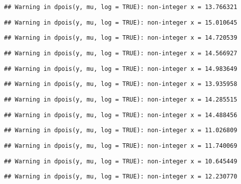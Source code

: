 \documentclass[
]{article}
\begin{document}
\begin{verbatim}
## Warning in dpois(y, mu, log = TRUE): non-integer x = 13.766321
\end{verbatim}

\begin{verbatim}
## Warning in dpois(y, mu, log = TRUE): non-integer x = 15.010645
\end{verbatim}

\begin{verbatim}
## Warning in dpois(y, mu, log = TRUE): non-integer x = 14.720539
\end{verbatim}

\begin{verbatim}
## Warning in dpois(y, mu, log = TRUE): non-integer x = 14.566927
\end{verbatim}

\begin{verbatim}
## Warning in dpois(y, mu, log = TRUE): non-integer x = 14.983649
\end{verbatim}

\begin{verbatim}
## Warning in dpois(y, mu, log = TRUE): non-integer x = 13.935958
\end{verbatim}

\begin{verbatim}
## Warning in dpois(y, mu, log = TRUE): non-integer x = 14.285515
\end{verbatim}

\begin{verbatim}
## Warning in dpois(y, mu, log = TRUE): non-integer x = 14.488456
\end{verbatim}

\begin{verbatim}
## Warning in dpois(y, mu, log = TRUE): non-integer x = 11.026809
\end{verbatim}

\begin{verbatim}
## Warning in dpois(y, mu, log = TRUE): non-integer x = 11.740069
\end{verbatim}

\begin{verbatim}
## Warning in dpois(y, mu, log = TRUE): non-integer x = 10.645449
\end{verbatim}

\begin{verbatim}
## Warning in dpois(y, mu, log = TRUE): non-integer x = 12.230770
\end{verbatim}
\end{document}
